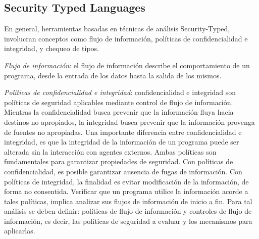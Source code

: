 \subsection{Security Typed Languages}
En general, herramientas basadas en técnicas de análisis
Security-Typed, involucran conceptos como flujo de información, políticas de
confidencialidad e integridad, y chequeo de tipos.

\emph{Flujo de información}: el flujo de información describe el
comportamiento de un programa, desde la entrada de los datos hasta la salida de
los mismos. 

\emph{Políticas de confidencialidad e integridad}: confidencialidad e integridad
son políticas de seguridad aplicables mediante control de flujo de información.
Mientras la confidencialidad busca prevenir que la información fluya hacia
destinos no apropiados, la integridad busca prevenir que la información provenga
de fuentes no apropiadas. Una importante diferencia entre confidencialidad e
integridad, es que la integridad de la información de un programa puede ser
alterada sin la interacción con agentes externos.\newline %
Ambas políticas son fundamentales para garantizar propiedades de
seguridad.\newline 
Con políticas de confidencialidad, es posible garantizar ausencia de fugas de
información. Con políticas de integridad, la finalidad es evitar
modificación de la información, de forma no consentida.\newline 
Verificar que un programa utilice la información acorde a
tales políticas, implica analizar sus flujos de información de inicio a fin.
Para tal análisis se deben definir: políticas de flujo de información y
controles de flujo de información, es decir, las políticas de seguridad a
evaluar y los mecanismos para aplicarlas. 

